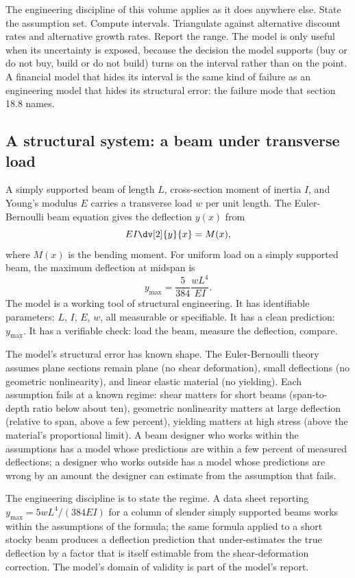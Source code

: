 The engineering discipline of this volume applies as it
does anywhere else. State the assumption set. Compute
intervals. Triangulate against alternative discount rates
and alternative growth rates. Report the range. The model is
only useful when its uncertainty is exposed, because the
decision the model supports (buy or do not buy, build or do
not build) turns on the interval rather than on the point.
A financial model that hides its interval is the same kind
of failure as an engineering model that hides its
structural error: the failure mode that section 18.8 names.

\subsection{A structural system: a beam under transverse load}

A simply supported beam of length $L$, cross-section moment of
inertia $I$, and Young's modulus $E$ carries a transverse load
$w$ per unit length. The Euler-Bernoulli beam equation gives
the deflection $y(x)$ from
\[
EI \dv[2]{y}{x} = M(x),
\]
where $M(x)$ is the bending moment. For uniform load on a
simply supported beam, the maximum deflection at midspan is
\[
y_{\max} = \frac{5}{384} \frac{w L^{4}}{E I}.
\]
The model is a working tool of structural engineering. It
has identifiable parameters: $L$, $I$, $E$, $w$, all measurable
or specifiable. It has a clean prediction: $y_{\max}$. It has
a verifiable check: load the beam, measure the deflection,
compare.

The model's structural error has known shape. The
Euler-Bernoulli theory assumes plane sections remain plane
(no shear deformation), small deflections (no geometric
nonlinearity), and linear elastic material (no yielding).
Each assumption fails at a known regime: shear matters for
short beams (span-to-depth ratio below about ten), geometric
nonlinearity matters at large deflection (relative to span,
above a few percent), yielding matters at high stress (above
the material's proportional limit). A beam designer who works
within the assumptions has a model whose predictions are
within a few percent of measured deflections; a designer who
works outside has a model whose predictions are wrong by an
amount the designer can estimate from the assumption that
fails.

The engineering discipline is to state the regime. A
data sheet reporting $y_{\max} = 5wL^{4}/(384 EI)$ for a
column of slender simply supported beams works within the
assumptions of the formula; the same formula applied to a
short stocky beam produces a deflection prediction that
under-estimates the true deflection by a factor that is
itself estimable from the shear-deformation correction.
The model's domain of validity is part of the model's
report.

